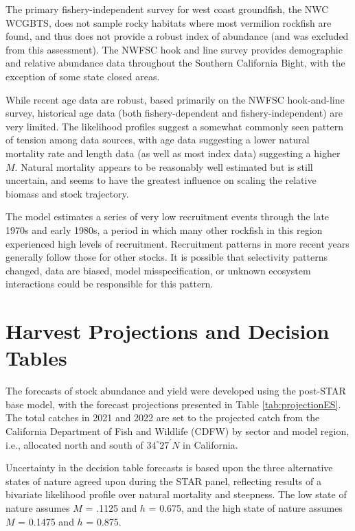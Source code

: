\documentclass[11pt,
  english,
]{article}
\begin{document}
The primary fishery-independent survey for west coast groundfish, the NWC WCGBTS, does not sample rocky habitats where most vermilion rockfish are found, and thus does not provide a robust index of abundance (and was excluded from this assessment). The NWFSC hook and line survey provides demographic and relative abundance data throughout the Southern California Bight, with the exception of some state closed areas.

While recent age data are robust, based primarily on the NWFSC hook-and-line survey, historical age data (both fishery-dependent and fishery-independent) are very limited. The likelihood profiles suggest a somewhat commonly seen pattern of tension among data sources, with age data suggesting a lower natural mortality rate and length data (as well as most index data) suggesting a higher {\(M\)\leavevmode\tagmcend\tagstructend}. Natural mortality appears to be reasonably well estimated but is still uncertain, and seems to have the greatest influence on scaling the relative biomass and stock trajectory.

The model estimates a series of very low recruitment events through the late 1970s and early 1980s, a period in which many other rockfish in this region experienced high levels of recruitment. Recruitment patterns in more recent years generally follow those for other stocks. It is possible that selectivity patterns changed, data are biased, model misspecification, or unknown ecosystem interactions could be responsible for this pattern.


\hypertarget{harvest-projections-and-decision-tables}{%
\section{Harvest Projections and Decision Tables}\label{harvest-projections-and-decision-tables}}

\leavevmode\tagmcend\tagstructend

The forecasts of stock abundance and yield were developed using the post-STAR base model, with the forecast projections presented in Table \ref{tab:projectionES}. The total catches in 2021 and 2022 are set to the projected catch from the California Department of Fish and Wildlife (CDFW) by sector and model region, i.e., allocated north and south of $34^\circ 27^\prime N$ in California.

Uncertainty in the decision table forecasts is based upon the three alternative states of nature agreed upon during the STAR panel, reflecting results of a bivariate likelihood profile over natural mortality and steepness. The low state of nature assumes {\(M\)\leavevmode\tagmcend\tagstructend} = .1125 and {\(h\)\leavevmode\tagmcend\tagstructend} = 0.675, and the high state of nature assumes {\(M\)\leavevmode\tagmcend\tagstructend} = 0.1475 and {\(h\)\leavevmode\tagmcend\tagstructend} = 0.875.
\end{document}
